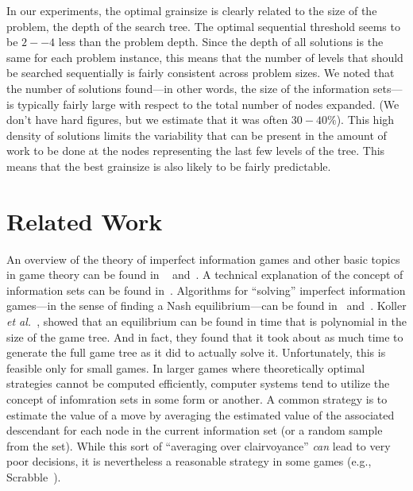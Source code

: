 \documentclass[11pt]{article}
\newcommand{\etal}{{\em et al.}\ }
\begin{document}
In our experiments, the optimal grainsize is clearly related to the size of the problem, the depth of the search tree.
The optimal sequential threshold seems to be $2--4$ less than the problem depth.  Since the depth of all solutions is
the same for each problem instance, this means that the number of levels that should be searched sequentially is fairly
consistent across problem sizes.  We noted that the number of solutions found---in other words, the size of the
information sets---is typically fairly large with respect to the total number of nodes expanded.  (We don't have hard
figures, but we estimate that it was often $30-40\%$).  This high density of solutions limits the variability that can
be present in the amount of work to be done at the nodes representing the last few levels of the tree.  This means that
the best grainsize is also likely to be fairly predictable.  

\section{Related Work}
An overview of the theory of imperfect information games and other basic topics in game theory can be found in
~\cite{kuhn03lectures} and~\cite{kuhn97classics}.  A technical explanation of the concept of information sets can be
found in~\cite{gilpin07algorithms}.  Algorithms for ``solving'' imperfect information games---in the sense of finding a
Nash equilibrium---can be found in~\cite{koller94fast} and~\cite{koller97representations}.  Koller \etal, showed that an
equilibrium can be found in time that is polynomial in the size of the game tree.  And in fact, they found that it took
about as much time to generate the full game tree as it did to actually solve it.  Unfortunately, this is feasible only
for small games.  In larger games where theoretically optimal strategies cannot be computed efficiently, computer
systems tend to utilize the concept of infomration sets in some form or another.  A common strategy is to estimate the
value of a move by averaging the estimated value of the associated descendant for each node in the current information
set (or a random sample from the set).  While this sort of ``averaging over clairvoyance'' {\em can} lead to very poor
decisions, it is nevertheless a reasonable strategy in some games (e.g., Scrabble~\cite{sheppard02world}).
\end{document}

